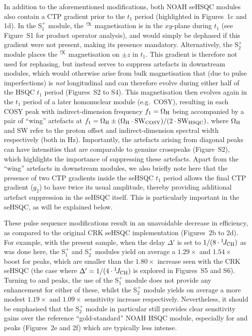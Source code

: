 \documentclass[final,twocolumn]{elsarticle}
\newcommand*{\noahSpa}{S$^+_1$}
\newcommand*{\noahSpb}{S$^+_2$}
\newcommand*{\nitrogen}{\ce{^{15}N}}
\newcommand*{\onejch}{{}^{1}\!J_{\ce{CH}}}
\newcommand*{\magnnot}[1]{\ce{^1H}$^{!#1}$}
\begin{document}
In addition to the aforementioned modifications, both NOAH seHSQC modules also contain a CTP gradient prior to the $t_1$ period (highlighted in Figures~1c and 1d).
In the \noahSpa{} module, the \magnnot{\ce{X}} magnetisation is in the $xy$-plane during $t_1$ (see Figure~S1 for product operator analysis), and would simply be dephased if this gradient were not present, making its presence mandatory.
Alternatively, the \noahSpb{} module places the \magnnot{\ce{X}} magnetisation on $\pm z$ in $t_1$.
This gradient is therefore not used for rephasing, but instead serves to suppress artefacts in downstream modules, which would otherwise arise from bulk magnetisation that (due to pulse imperfections) is \textit{not} longitudinal and can therefore evolve during either half of the HSQC $t_1$ period (Figures~S2 to S4).
This magnetisation then evolves again in the $t_1$ period of a later homonuclear module (e.g.\ COSY), resulting in each COSY peak with indirect-dimension frequency $f_1 = \Omega_{\ce{H}}$ being accompanied by a pair of ``wing'' artefacts at $f_1 = \Omega_{\ce{H}} \pm (\Omega_{\ce{H}}\cdot\mathrm{SW_{COSY}})/(2\cdot \mathrm{SW_{HSQC}})$, where $\Omega_{\ce{H}}$ and SW refer to the proton offset and indirect-dimension spectral width respectively (both in Hz).
Importantly, the artefacts arising from diagonal peaks can have intensities that are comparable to genuine crosspeaks (Figure~S2), which highlights the importance of suppressing these artefacts.
Apart from the ``wing'' artefacts in downstream modules, we also briefly note here that the presence of two CTP gradients inside the seHSQC $t_1$ period allows the final CTP gradient ($g_2$) to have twice its usual amplitude, thereby providing additional artefact suppression in the seHSQC itself.
This is particularly important in the \nitrogen{} seHSQC, as will be explained below.

These pulse sequence modifications result in an unavoidable decrease in efficiency, as compared to the original CRK seHSQC implementation (Figures~2b to 2d).
For example, with the present sample, when the delay $\Delta'$ is set to $1/(8\cdot\onejch)$ as was done here,\cite{Schleucher1994JBNMR} the \noahSpa{} and \noahSpb{} modules yield on average a $1.29\times$ and $1.54\times$ boost for  peaks, which are smaller than the $1.80\times$ increase seen with the CRK seHSQC (the case where $\Delta' = 1/(4\cdot\onejch)$ is explored in Figures~S5 and S6).
Turning to  and  peaks, the use of the \noahSpa{} module does not provide any enhancement for either of these, whilst the \noahSpb{} module yields on average a more modest $1.19\times$ and $1.09\times$ sensitivity increase respectively.
Nevertheless, it should be emphasised that the \noahSpb{} module in particular still provides clear sensitivity gains over the reference ``gold-standard'' NOAH HSQC module, especially for  and  peaks (Figures~2e and 2f) which are typically less intense.
\end{document}
